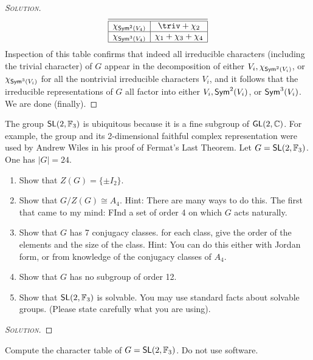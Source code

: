 \begin{proof}[{\scshape Solution}]
\[\begin{array}{|c|c|}
\hline
\hline \chi_{\Sym^2(V_4)}  & \triv + \chi_2 \\
\hline \chi_{\Sym^3(V_4)}  & \chi_1 + \chi_3 + \chi_4 \\
\hline
\end{array}
\]
Inspection of this table confirms that indeed all irreducible characters (including the trivial character) of $G$ appear in the decomposition of either $V_i, \chi_{\mathsf{Sym}^2(V_i)}$, or $\chi_{\mathsf{Sym}^3(V_i)}$ for all the nontrivial irreducible characters $V_i$, and it follows that the irreducible representations of $G$ all factor into either $V_i, \mathsf{Sym}^2(V_i)$, or $\mathsf{Sym}^3(V_i)$. We are done (finally).
\end{proof}

\newpage

\begin{problem}
The group $\mathsf{SL}(2, \mathbb{F}_3)$ is ubiquitous because it is a fine subgroup of $\mathsf{GL}(2,\mathbb{C})$. For example, the group and its 2-dimensional faithful complex representation were used by Andrew Wiles in his proof of Fermat's Last Theorem.
Let $G = \mathsf{SL}(2, \mathbb{F}_3)$. One has $\lvert G \rvert = 24$.
\begin{enumerate}[font=\normalfont,label=\textbf{(\Alph*)}]


  \item Show that $Z(G) = \{\pm I_2\}$.
  \item Show that $G/Z(G) \cong A_4$. Hint: There are many ways to do this. The first that came to my mind: FInd a set of order 4 on which $G$ acts naturally.
  \item Show that $G$ has 7 conjugacy classes. for each class, give the order of the elements and the size of the class. Hint: You can do this either with Jordan form, or from knowledge of the conjugacy classes of $A_4$.
  \item Show that $G$ has no subgroup of order 12.
  \item Show that $\mathsf{SL}(2, \mathbb{F}_3)$ is solvable. You may use standard facts about solvable groups. (Please state carefully what you are using).
\end{enumerate}
\end{problem}

\begin{proof}[{\scshape Solution}]

\end{proof}

\newpage

\begin{problem}
Compute the character table of $G = \mathsf{SL}(2, \mathbb{F}_3)$. Do not use software.
\end{problem}


